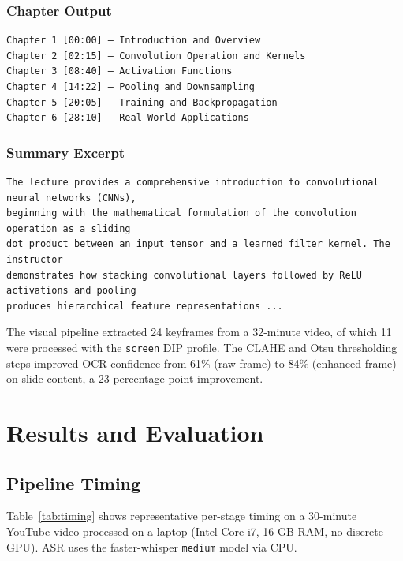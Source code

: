 \documentclass[12pt,a4paper]{article}
\begin{document}
\subsubsection*{Chapter Output}
\begin{lstlisting}[style=plain, caption={Generated chapter breakdown.}]
Chapter 1 [00:00] — Introduction and Overview
Chapter 2 [02:15] — Convolution Operation and Kernels
Chapter 3 [08:40] — Activation Functions
Chapter 4 [14:22] — Pooling and Downsampling
Chapter 5 [20:05] — Training and Backpropagation
Chapter 6 [28:10] — Real-World Applications
\end{lstlisting}

\subsubsection*{Summary Excerpt}
\begin{lstlisting}[style=plain, caption={Excerpt from the generated full summary.}]
The lecture provides a comprehensive introduction to convolutional neural networks (CNNs),
beginning with the mathematical formulation of the convolution operation as a sliding
dot product between an input tensor and a learned filter kernel. The instructor
demonstrates how stacking convolutional layers followed by ReLU activations and pooling
produces hierarchical feature representations ...
\end{lstlisting}

The visual pipeline extracted 24 keyframes from a 32-minute video, of which 11 were
processed with the \texttt{screen} DIP profile. The CLAHE and Otsu thresholding steps
improved OCR confidence from 61\% (raw frame) to 84\% (enhanced frame) on slide
content, a 23-percentage-point improvement.

\section{Results and Evaluation}
\label{sec:results}

\subsection{Pipeline Timing}

Table~\ref{tab:timing} shows representative per-stage timing on a 30-minute YouTube
video processed on a laptop (Intel Core i7, 16 GB RAM, no discrete GPU). ASR uses
the faster-whisper \texttt{medium} model via CPU.
\end{document}

